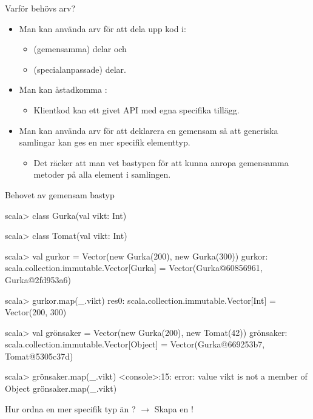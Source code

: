 \begin{Slide}{Varför behövs arv?}
\begin{itemize}
\item Man kan använda arv för att dela upp kod i:
\begin{itemize}
\item {} (gemensamma) delar och
\item {} (specialanpassade) delar.
\end{itemize}

\item Man kan åstadkomma :
\begin{itemize}
\item Klientkod kan   ett givet API med egna specifika tillägg.
\end{itemize}

\item Man kan använda arv för att deklarera en gemensam  så att generiska samlingar kan ges en mer specifik elementtyp.
\begin{itemize}
\item Det räcker att man vet bastypen för att kunna anropa gemensamma metoder på alla element i samlingen.
\end{itemize}
\end{itemize}
\end{Slide}


\begin{Slide}{Behovet av gemensam bastyp}\SlideFontSmall
\begin{REPL}
scala> class Gurka(val vikt: Int)

scala> class Tomat(val vikt: Int)

scala> val gurkor = Vector(new Gurka(200), new Gurka(300))
gurkor: scala.collection.immutable.Vector[Gurka] =
  Vector(Gurka@60856961, Gurka@2fd953a6)

scala> gurkor.map(_.vikt)
res0: scala.collection.immutable.Vector[Int] = Vector(200, 300)

scala> val grönsaker = Vector(new Gurka(200), new Tomat(42))
grönsaker: scala.collection.immutable.Vector[Object] =
  Vector(Gurka@669253b7, Tomat@5305c37d)

scala> grönsaker.map(_.vikt)
<console>:15: error: value vikt is not a member of Object
       grönsaker.map(_.vikt)
\end{REPL}
Hur ordna en mer specifik typ än ? \pause$\rightarrow$ Skapa en !
\end{Slide}




